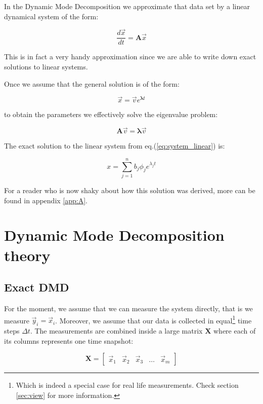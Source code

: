 \documentclass[10pt,twocolumn]{article}
\begin{document}
In the Dynamic Mode Decomposition we approximate that data set by a linear dynamical system of the form:

\begin{equation} \label{eq:system_linear}
\frac{d \vec{x}}{dt} = \bm{A} \vec{x}
\end{equation}

This is in fact a very handy approximation since we are able to write down exact solutions to linear systems.

Once we assume that the general solution is of the form:

\begin{equation} \label{eq:general_solution}
\vec{x} = \vec{v} e^{\bm{\lambda} t}
\end{equation}

to obtain the parameters we effectively solve the eigenvalue problem:

\begin{equation} \label{eq:eigenvalue_solution}
\bm{A} \vec{v} = \bm{\lambda} \vec{v}
\end{equation}

The exact solution to the linear system from eq.(\ref{eq:system_linear}) is:

\begin{equation} \label{eq:soln_exact}
x = \sum_{j = 1}^{n} b_j \phi_j e^{\lambda_j t}
\end{equation}

For a reader who is now shaky about how this solution was derived, more can be found in appendix \ref{app:A}. 

\section{Dynamic Mode Decomposition theory}

\subsection{Exact DMD}

For the moment, we assume that we can measure the system directly, that is we measure $\vec{y}_i = \vec{x}_i$. Moreover, we assume that our data is collected in equal\footnote{Which is indeed a special case for real life measurements. Check section \ref{sec:view} for more information.} time steps $\Delta t$. The measurements are combined inside a large matrix $\bm{X}$ where each of its columns represents one time snapshot:

\begin{equation} \label{eq:X}
\bm{X} = 
\begin{bmatrix}
    \vec{x}_1 & \vec{x}_2 & \vec{x}_3 & \dots & \vec{x}_{m}
\end{bmatrix}
\end{equation}
\end{document}
